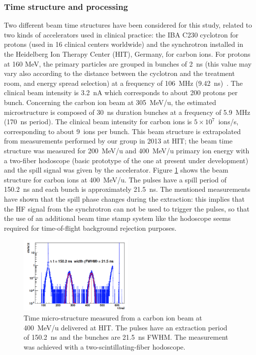 \subsubsection{Time structure and processing}
\label{subsubsection:modelisation_fasceau_ions_CC_hadrontherapy_Geant4}
 
Two different beam time structures have been considered for this study, related to two kinds of accelerators used in clinical practice: the IBA C230 cyclotron for protons (used in 16 clinical centers worldwide) and the synchrotron installed in the Heidelberg Ion Therapy Center (HIT), Germany, for carbon ions. For protons at 160 MeV, the primary particles are grouped in bunches of 2~ns (this value may vary also according to the distance between the cyclotron and the treatment room, and energy spread selection) at a frequency of 106~MHz (9.42~ns)~\cite{f_roellinghoff_real-time_2014}. The clinical beam intensity is 3.2~nA which corresponds to about 200 protons per bunch. Concerning the carbon ion beam at 305~MeV/u, the estimated microstructure is composed of 30~ns duration bunches at a frequency of 5.9~MHz (170~ns period). The clinical beam intensity for carbon ions is $5\times10^7$~ions/s, corresponding to about 9~ions per bunch. This beam structure is extrapolated from measurements performed by our group in 2013 at HIT; the beam time structure was measured for 200~MeV/u and 400~MeV/u primary ion energy with a two-fiber hodoscope (basic prototype of the one at present under development) and the spill signal was given by the accelerator. Figure \ref{fig:fig_structure_temps_faisceau_HIT_2013_CC_simulation_Hadronth} shows the beam structure for carbon ions at 400~MeV/u. The pulses have a spill period of 150.2~ns and each bunch is approximately 21.5~ns.
The mentioned measurements have shown that the spill phase changes during the extraction: this implies that the HF signal from the synchrotron can not be used to trigger the pulses, so that the use of an additional beam time stamp system like the hodoscope seems required for time-of-flight background rejection purposes.\newline

	\begin{figure} [!hbtp]	
	\centering
	\includegraphics[width=0.5\textwidth]{./Figure/2013_Structure_Time_Beam_400MeV.png}
	\caption{Time micro-structure measured from a carbon ion beam at 400~MeV/u delivered at HIT. The pulses have an extraction period of 150.2~ns and the bunches are 21.5~ns FWHM. The measurement was achieved with a two-scintillating-fiber hodoscope.}
	\label{fig:fig_structure_temps_faisceau_HIT_2013_CC_simulation_Hadronth}
	\end{figure}



